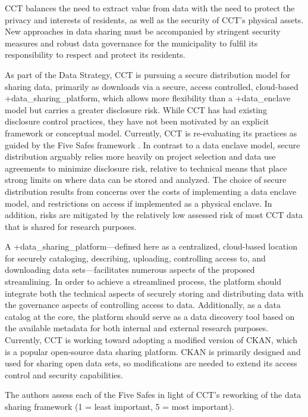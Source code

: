 \documentclass[
]{book}
\begin{document}
CCT balances the need to extract value from data with the need to protect the privacy and interests of residents, as well as the security of CCT's physical assets. New approaches in data sharing must be accompanied by stringent security measures and robust data governance for the municipality to fulfil its responsibility to respect and protect its residents.

As part of the Data Strategy, CCT is pursuing a secure distribution model for sharing data, primarily as downloads via a secure, access controlled, cloud-based +data\_sharing\_platform\textbar, which allows more flexibility than a +data\_enclave\textbar{} model but carries a greater disclosure risk. While CCT has had existing disclosure control practices, they have not been motivated by an explicit framework or conceptual model. Currently, CCT is re-evaluating its practices as guided by the Five Safes framework \citep{desai2016}. In contrast to a data enclave model, secure distribution arguably relies more heavily on project selection and data use agreements to minimize disclosure risk, relative to technical means that place strong limits on where data can be stored and analyzed. The choice of secure distribution results from concerns over the costs of implementing a data enclave model, and restrictions on access if implemented as a physical enclave. In addition, risks are mitigated by the relatively low assessed risk of most CCT data that is shared for research purposes.

A +data\_sharing\_platform\textbar---defined here as a centralized, cloud-based location for securely cataloging, describing, uploading, controlling access to, and downloading data sets---facilitates numerous aspects of the proposed streamlining. In order to achieve a streamlined process, the platform should integrate both the technical aspects of securely storing and distributing data with the governance aspects of controlling access to data. Additionally, as a data catalog at the core, the platform should serve as a data discovery tool based on the available metadata for both internal and external research purposes. Currently, CCT is working toward adopting a modified version of CKAN, which is a popular open-source data sharing platform. CKAN is primarily designed and used for sharing open data sets, so modifications are needed to extend its access control and security capabilities.

The authors assess each of the Five Safes in light of CCT's reworking of the data sharing framework (1 = least important, 5 = most important).
\end{document}
